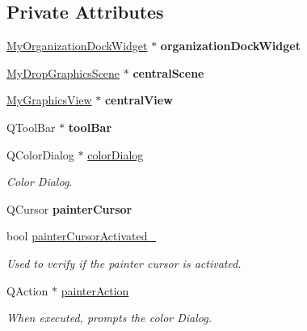 \subsection*{Private Attributes}
\begin{DoxyCompactItemize}
\item 
\hypertarget{class_main_window_aee01240061a0ca10f2976a97a0b149bd}{}\hyperlink{class_my_organization_dock_widget}{My\+Organization\+Dock\+Widget} $\ast$ {\bfseries organization\+Dock\+Widget}\label{class_main_window_aee01240061a0ca10f2976a97a0b149bd}

\item 
\hypertarget{class_main_window_a9b2426acb3ca17d40cf8737232e2954d}{}\hyperlink{class_my_drop_graphics_scene}{My\+Drop\+Graphics\+Scene} $\ast$ {\bfseries central\+Scene}\label{class_main_window_a9b2426acb3ca17d40cf8737232e2954d}

\item 
\hypertarget{class_main_window_a7cadaf2fb139d350020b0a0e7fd9c8eb}{}\hyperlink{class_my_graphics_view}{My\+Graphics\+View} $\ast$ {\bfseries central\+View}\label{class_main_window_a7cadaf2fb139d350020b0a0e7fd9c8eb}

\item 
\hypertarget{class_main_window_a10d2a8149dc4da0a7df5ee9e4e189721}{}Q\+Tool\+Bar $\ast$ {\bfseries tool\+Bar}\label{class_main_window_a10d2a8149dc4da0a7df5ee9e4e189721}

\item 
Q\+Color\+Dialog $\ast$ \hyperlink{class_main_window_a840d28fd8f004fd5a1ea97dd7cbe7e50}{color\+Dialog}
\begin{DoxyCompactList}\small\item\em Color Dialog. \end{DoxyCompactList}\item 
\hypertarget{class_main_window_ace14b6e7cbc0b167e0d3113050645f69}{}Q\+Cursor {\bfseries painter\+Cursor}\label{class_main_window_ace14b6e7cbc0b167e0d3113050645f69}

\item 
bool \hyperlink{class_main_window_a09dfa34e541dff8ab1e4f29bfca76169}{painter\+Cursor\+Activated\+\_\+}
\begin{DoxyCompactList}\small\item\em Used to verify if the painter cursor is activated. \end{DoxyCompactList}\item 
Q\+Action $\ast$ \hyperlink{class_main_window_a95374ee491dceb4ee57e27afff60d56b}{painter\+Action}
\begin{DoxyCompactList}\small\item\em When executed, prompts the color Dialog. \end{DoxyCompactList}\end{DoxyCompactItemize}


